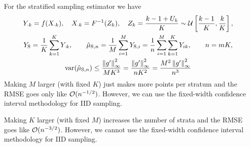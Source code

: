 \documentclass{amsart}
\begin{document}
For the stratified sampling estimator we have 
\begin{gather*}
Y_{\cdot k}=f(X_{\cdot k}), \quad X_{\cdot k}=F^{-1}(Z_{k}), \quad Z_{k} = \frac{k-1 + U_{k}}{K} \sim \cu \left[\frac{k-1}K, \frac kK\right], \\
Y_{\text{S}} = \frac1K \sum_{k=1}^K Y_{\cdot k}, \qquad \hmu_{\text{S},n} = \frac 1M \sum_{i=1}^M Y_{\text{S},i} = \frac 1n \sum_{i=1}^M \sum_{k=1}^K Y_{ik}, \qquad n=mK,\\
\var(\hmu_{\text{S},n}) \le  \frac{\norm[\infty]{g'}^2}{MK^3} = \frac{\norm[\infty]{g'}^2}{nK^2} = \frac{M^2\norm[\infty]{g'}^2}{n^3}
\end{gather*}
Making $M$ larger (with fixed $K$) just makes more points per stratum and the RMSE goes only like $\Order(n^{-1/2})$.  However, we can use the fixed-width confidence interval methodology for IID sampling.   

Making $K$ larger (with fixed $M$) increases the number of strata and the RMSE goes like $\Order(n^{-3/2})$. However, we cannot use the fixed-width confidence interval methodology for IID sampling.







\end{document}
